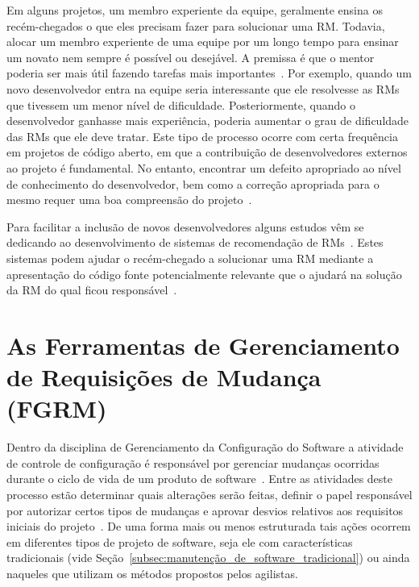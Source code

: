 Em alguns projetos, um membro experiente da equipe, geralmente ensina os
recém-chegados o que eles precisam fazer para solucionar uma RM\@. Todavia,
alocar um membro experiente de uma equipe por um longo tempo para ensinar um
novato nem sempre é possível ou desejável. A premissa é que o mentor poderia ser
mais útil fazendo tarefas mais importantes~\cite{malheiros2012source}. Por
exemplo, quando um novo desenvolvedor entra na equipe seria interessante que ele
resolvesse as RMs que tivessem um menor nível de dificuldade. Posteriormente,
quando o desenvolvedor ganhasse mais experiência, poderia aumentar o grau de
dificuldade das RMs que ele deve tratar. Este tipo de processo ocorre com certa
frequência em projetos de código aberto, em que a contribuição de desenvolvedores
externos ao projeto é fundamental. No entanto, encontrar um defeito apropriado
ao nível de conhecimento do desenvolvedor, bem como a correção apropriada para o
mesmo requer uma boa compreensão do projeto~\cite{Wang2011bug}.

Para facilitar a inclusão de novos desenvolvedores alguns estudos vêm se
dedicando ao desenvolvimento de sistemas de recomendação de
RMs~\cite{malheiros2012source, Wang2011bug}. Estes sistemas podem ajudar o
recém-chegado a solucionar uma RM mediante a apresentação do código fonte
potencialmente relevante que o ajudará na solução da RM do qual ficou
responsável~\cite{malheiros2012source}.


\section{As Ferramentas de Gerenciamento de Requisições de Mudança (FGRM)}
\label{sec:ferramentas_de_gerenciamento_requisicoes_de_mudanca}

Dentro da disciplina de Gerenciamento da Configuração do Software a atividade de
controle de configuração é responsável por gerenciar mudanças ocorridas durante
o ciclo de vida de um produto de software~\cite{tripathy2014software}. Entre as
atividades deste processo estão determinar quais alterações serão feitas,
definir o papel responsável por autorizar certos tipos de mudanças e aprovar
desvios relativos aos requisitos iniciais do projeto~\cite{4425813}. De uma
forma mais ou menos estruturada tais ações ocorrem em diferentes tipos de
projeto de software, seja ele com características tradicionais (vide
Seção~\ref{subsec:manutenção_de_software_tradicional}) ou ainda naqueles que
utilizam os métodos propostos pelos agilistas.


